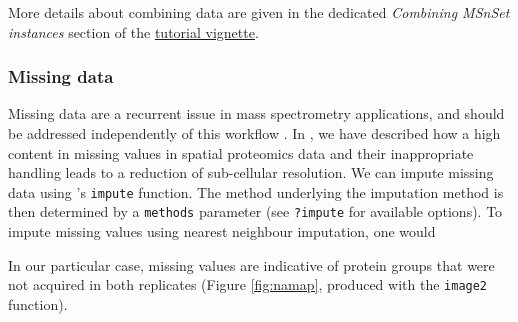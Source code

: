 More details about combining data are given in the dedicated
\textit{Combining MSnSet instances} section of the 
\href{http://bioconductor.org/packages/release/bioc/vignettes/MSnbase/inst/doc/MSnbase-demo.pdf}{tutorial
  vignette}.

\subsubsection*{Missing data}

Missing data are a recurrent issue in mass spectrometry applications,
and should be addressed independently of this workflow
\cite{Webb-Robertson:2015,Lazar:2016}. In \cite{Gatto:2014b}, we have
described how a high content in missing values in spatial proteomics
data and their inappropriate handling leads to a reduction of
sub-cellular resolution. We can impute missing data using
's \texttt{impute} function. The method underlying
the imputation method is then determined by a \texttt{methods}
parameter (see \texttt{?impute} for available options). To impute
missing values using nearest neighbour imputation, one would

\begin{knitrout}
\color{fgcolor}\begin{kframe}
\begin{alltt}
 \hlkwb{<-}   \hlstd{=} \hlstd{)}
\end{alltt}
\end{kframe}
\end{knitrout}

In our particular case, missing values are indicative of protein
groups that were not acquired in both replicates (Figure
\ref{fig:namap}, produced with the \texttt{image2} function).

